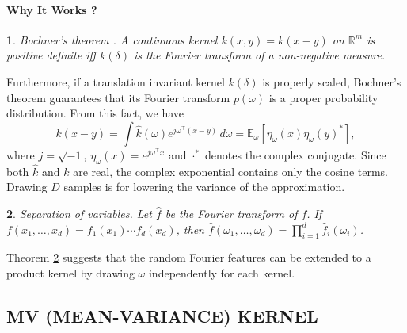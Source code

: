\documentclass[english]{article}
\theoremstyle{plain}
\newtheorem{thm}{\protect\theoremname}
\theoremstyle{plain}
\providecommand{\theoremname}{Theorem}
\begin{document}
\paragraph{Why It Works ?}
\begin{thm}
Bochner's theorem . A continuous kernel $k(x,y)=k(x-y)$ on $\mathbb{R}^{m}$
is positive definite iff $k(\delta)$ is the Fourier transform of
a non-negative measure.
\end{thm}
%
Furthermore, if a translation invariant kernel $k(\delta)$ is properly
scaled, Bochner's theorem guarantees that its Fourier transform $p(\omega)$
is a proper probability distribution. From this fact, we have 
\[
k(x-y)=\int\hat{k}(\omega)e^{j\omega^{\top}\left(x-y\right)}\, d\omega=\mathbb{E}_{\omega}\left[\eta_{\omega}(x)\eta_{\omega}(y)^{*}\right], 
\]
where $j=\sqrt{-1}$, $\eta_{\omega}(x)=e^{j\omega^{\top}x}$ and $\cdot^{*}$ denotes
the complex conjugate. Since both $\hat{k}$ and $k$ are real, the complex
exponential contains only the cosine terms. Drawing $D$ samples is
for lowering the variance of the approximation.
%
\begin{thm}
\label{thm:Separation-of-variables.}Separation of variables. Let
$\hat{f}$ be the Fourier transform of $f$. If $f(x_{1},\ldots,x_{d})=f_{1}(x_{1})\cdots f_{d}(x_{d})$,
then $\hat{f}(\omega_{1},\ldots,\omega_{d})=\prod_{i=1}^{d}\hat{f}_{i}(\omega_{i})$. 
\end{thm}
Theorem \ref{thm:Separation-of-variables.} suggests that the random
Fourier features can be extended to a product kernel by drawing $\omega$
independently for each kernel. 

\subsection{MV (MEAN-VARIANCE) KERNEL }
\label{sec:mv_kernel}
\end{document}
